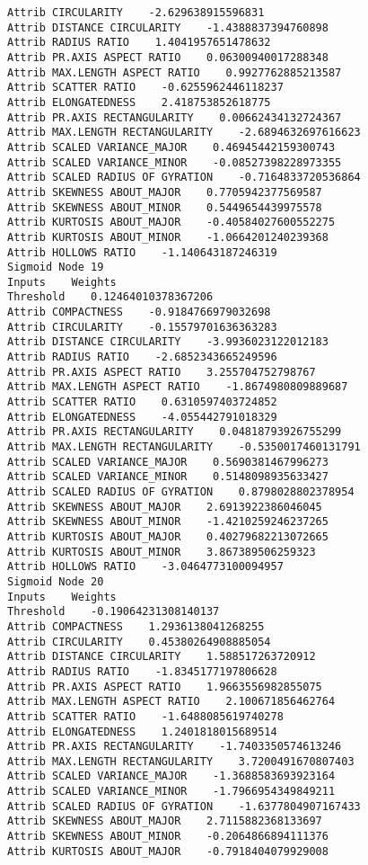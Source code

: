 \documentclass[
	article,			%
	11pt,				%
	oneside,			%
	a4paper,			%
	english,			%
	brazil,				%
	sumario=tradicional
	]{abntex2}
\begin{document}
\begin{lstlisting}
Attrib CIRCULARITY    -2.629638915596831
Attrib DISTANCE CIRCULARITY    -1.4388837394760898
Attrib RADIUS RATIO    1.4041957651478632
Attrib PR.AXIS ASPECT RATIO    0.06300940017288348
Attrib MAX.LENGTH ASPECT RATIO    0.9927762885213587
Attrib SCATTER RATIO    -0.6255962446118237
Attrib ELONGATEDNESS    2.418753852618775
Attrib PR.AXIS RECTANGULARITY    0.00662434132724367
Attrib MAX.LENGTH RECTANGULARITY    -2.6894632697616623
Attrib SCALED VARIANCE_MAJOR    0.46945442159300743
Attrib SCALED VARIANCE_MINOR    -0.08527398228973355
Attrib SCALED RADIUS OF GYRATION    -0.7164833720536864
Attrib SKEWNESS ABOUT_MAJOR    0.7705942377569587
Attrib SKEWNESS ABOUT_MINOR    0.5449654439975578
Attrib KURTOSIS ABOUT_MAJOR    -0.40584027600552275
Attrib KURTOSIS ABOUT_MINOR    -1.0664201240239368
Attrib HOLLOWS RATIO    -1.140643187246319
Sigmoid Node 19
Inputs    Weights
Threshold    0.12464010378367206
Attrib COMPACTNESS    -0.9184766979032698
Attrib CIRCULARITY    -0.15579701636363283
Attrib DISTANCE CIRCULARITY    -3.9936023122012183
Attrib RADIUS RATIO    -2.6852343665249596
Attrib PR.AXIS ASPECT RATIO    3.255704752798767
Attrib MAX.LENGTH ASPECT RATIO    -1.8674980809889687
Attrib SCATTER RATIO    0.6310597403724852
Attrib ELONGATEDNESS    -4.055442791018329
Attrib PR.AXIS RECTANGULARITY    0.04818793926755299
Attrib MAX.LENGTH RECTANGULARITY    -0.5350017460131791
Attrib SCALED VARIANCE_MAJOR    0.5690381467996273
Attrib SCALED VARIANCE_MINOR    0.5148098935633427
Attrib SCALED RADIUS OF GYRATION    0.8798028802378954
Attrib SKEWNESS ABOUT_MAJOR    2.6913922386046045
Attrib SKEWNESS ABOUT_MINOR    -1.4210259246237265
Attrib KURTOSIS ABOUT_MAJOR    0.40279682213072665
Attrib KURTOSIS ABOUT_MINOR    3.867389506259323
Attrib HOLLOWS RATIO    -3.0464773100094957
Sigmoid Node 20
Inputs    Weights
Threshold    -0.19064231308140137
Attrib COMPACTNESS    1.2936138041268255
Attrib CIRCULARITY    0.45380264908885054
Attrib DISTANCE CIRCULARITY    1.588517263720912
Attrib RADIUS RATIO    -1.8345177197806628
Attrib PR.AXIS ASPECT RATIO    1.9663556982855075
Attrib MAX.LENGTH ASPECT RATIO    2.100671856462764
Attrib SCATTER RATIO    -1.6488085619740278
Attrib ELONGATEDNESS    1.2401818015689514
Attrib PR.AXIS RECTANGULARITY    -1.7403350574613246
Attrib MAX.LENGTH RECTANGULARITY    3.7200491670807403
Attrib SCALED VARIANCE_MAJOR    -1.3688583693923164
Attrib SCALED VARIANCE_MINOR    -1.7966954349849211
Attrib SCALED RADIUS OF GYRATION    -1.6377804907167433
Attrib SKEWNESS ABOUT_MAJOR    2.7115882368133697
Attrib SKEWNESS ABOUT_MINOR    -0.2064866894111376
Attrib KURTOSIS ABOUT_MAJOR    -0.7918404079929008

\end{lstlisting}
\end{document}
